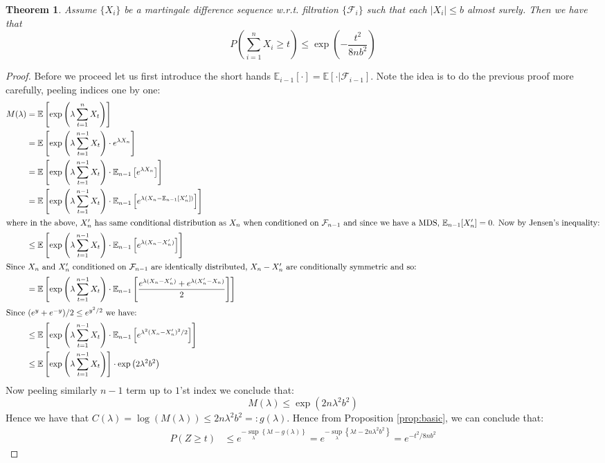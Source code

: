 \documentclass[11pt]{article}
\newcommand{\E}{\ensuremath{\mathbb{E}}}
\newcommand{\F}{\ensuremath{\mathcal{F}}}
\newcommand{\Exp}[1]{\ensuremath{\mathbb{E}}\left[#1\right]}
\newtheorem{theorem}{Theorem}
\begin{document}
\begin{theorem}
Assume $\{X_i\}$ be a martingale difference sequence w.r.t. filtration $\{\F_i\}$ such that each $|X_i| \le b$ almost surely. Then we have that
$$
P\left(\sum_{i=1}^n X_i \ge t\right) \le \exp\left(- \frac{t^2 }{8 n b^2} \right)
$$
\end{theorem}
\begin{proof}
Before we proceed let us first introduce the short hands $\E_{i-1}[\cdot] = \Exp{ \cdot| \F_{i-1}}$. Note the idea is to do the previous proof more carefully, peeling indices one by one:
\begin{align*}
M(\lambda) &= \Exp{\exp\left(\lambda \sum_{t=1}^n X_t\right)}\\
&=  \Exp{\exp\left(\lambda  \sum_{t=1}^{n-1} X_t\right) \cdot e^{\lambda X_n}}\\
&= \Exp{\exp\left(\lambda  \sum_{t=1}^{n-1} X_t\right) \cdot \E_{n-1}\left[e^{\lambda X_n}\right]}\\
&= \Exp{\exp\left(\lambda  \sum_{t=1}^{n-1} X_t\right) \cdot \E_{n-1}\left[e^{\lambda (X_n - \E_{n-1}[X'_n])}\right]}\\
\intertext{where in the above, $X'_n$ has same conditional distribution as $X_n$ when conditioned on $\F_{n-1}$ and since we have a MDS, $\E_{n-1}[X'_n] = 0$. Now by Jensen's inequality:}
&\le \Exp{\exp\left(\lambda  \sum_{t=1}^{n-1} X_t\right) \cdot \E_{n-1}\left[e^{\lambda (X_n - X'_n)}\right]}\\
\intertext{Since $X_n$ and $X'_n$ conditioned on $\F_{n-1}$ are identically distributed, $X_n - X'_n$ are conditionally symmetric and so:}
&= \Exp{\exp\left(\lambda  \sum_{t=1}^{n-1} X_t\right) \cdot \E_{n-1}\left[\frac{e^{\lambda (X_n - X'_n)}+ e^{\lambda (X'_n - X_n)}}{2}\right]}\\
\intertext{Since $(e^y + e^{-y})/2 \le e^{y^2 / 2}$ we have:}
&\le \Exp{\exp\left(\lambda  \sum_{t=1}^{n-1} X_t\right) \cdot \E_{n-1}\left[e^{\lambda^2 (X_n - X'_n)^2/2}\right]}\\
&\le \Exp{\exp\left(\lambda  \sum_{t=1}^{n-1} X_t\right) } \cdot \exp\left(2 \lambda^2 b^2 \right)
\end{align*}
Now peeling similarly $n-1$ term up to $1$'st index we conclude that:
$$
M(\lambda) \le \exp\left(2 n \lambda^2 b^2 \right)
$$
Hence we have that $C(\lambda) = \log(M(\lambda)) \le 2 n \lambda^2 b^2 =: g(\lambda)$. Hence from Proposition \ref{prop:basic}, we can conclude that:
\begin{align*}
P(Z \ge t) &\le e^{- \sup_{\lambda}\left\{ \lambda t - g(\lambda) \right\}} = e^{- \sup_{\lambda}\left\{ \lambda t - 2 n \lambda^2 b^2 \right\}}  = e^{-  t^2/8 n b^2 }
\end{align*}
\end{proof}
\end{document}
